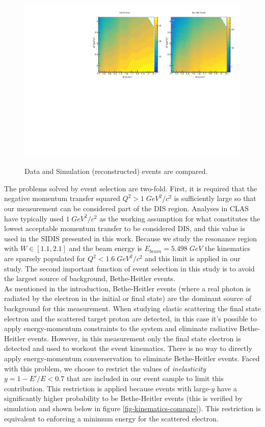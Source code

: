\begin{figure}
	\centering
	\includegraphics[width=\textwidth]{image/plots/inclusive/w_qq.pdf}
	\label{fig:wqq-data-sim}
	\caption{Data and Simulation (reconstructed) events are compared.}
\end{figure}

The problems solved by event selection are two-fold.  First, it is required that the negative momentum transfer squared $Q^2 > 1 \; GeV^2/c^2$ is sufficiently large so that our measurement can be considered part of the DIS region.  Analyses in CLAS have typically used $1 \; GeV^2/c^2$ as the working assumption for what constitutes the lowest acceptable momentum transfer to be considered DIS, and this value is used in the SIDIS presented in this work.  Because we study the resonance region with $W \in [1.1, 2.1]$ and the beam energy is $E_{beam} = 5.498 \; GeV$ the kinematics are sparsely populated for $Q^2 < 1.6 \; GeV^2/c^2$ and this limit is applied in our study.  The second important function of event selection in this study is to avoid the largest source of background, Bethe-Heitler events. \\

As mentioned in the introduction, Bethe-Heitler events (where a real photon is radiated by the electron in the initial or final state) are the dominant source of background for this measurement.  When studying elastic scattering the final state electron and the scattered target proton are detected, in this case it's possible to apply energy-momentum constraints to the system and eliminate radiative Bethe-Heitler events.  However, in this measurement only the final state electron is detected and used to workout the event kinematics.  There is no way to directly apply energy-momentum converservation to eliminate Bethe-Heitler events.  Faced with this problem, we choose to restrict the values of \textit{inelasticity} $y = 1-E'/E < 0.7$ that are included in our event sample to limit this contribution.  This restriction is applied because events with large-$y$ have a significantly higher probability to be Bethe-Heitler events (this is verified by simulation and shown below in figure \ref{fig-kinematics-compare}).  This restriction is equivalent to enforcing a minimum energy for the scattered electron.

